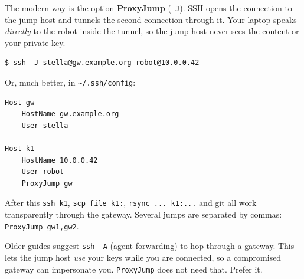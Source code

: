 \begin{center}
\label{fig:l3_jump}
\end{center}

The modern way is the option \textbf{ProxyJump} (\texttt{-J}). SSH opens the connection to the jump host and tunnels the second connection through it. Your laptop speaks \emph{directly} to the robot inside the tunnel, so the jump host never sees the content or your private key.
\begin{verbatim}
$ ssh -J stella@gw.example.org robot@10.0.0.42
\end{verbatim}
Or, much better, in \texttt{\textasciitilde/.ssh/config}:
\begin{verbatim}
Host gw
    HostName gw.example.org
    User stella

Host k1
    HostName 10.0.0.42
    User robot
    ProxyJump gw
\end{verbatim}
After this \verb|ssh k1|, \verb|scp file k1:|, \verb|rsync ... k1:...| and git all work transparently through the gateway. Several jumps are separated by commas: \verb|ProxyJump gw1,gw2|.

\begin{keyidea}
Older guides suggest \texttt{ssh -A} (agent forwarding) to hop through a gateway. This lets the jump host \emph{use} your keys while you are connected, so a compromised gateway can impersonate you. \texttt{ProxyJump} does not need that. Prefer it.
\end{keyidea}

